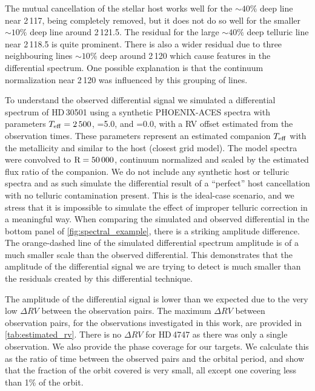 The mutual cancellation of the stellar host works well for the \(\sim40\%\) deep line near 2\,117\nm{}, being completely removed, but it does not do so well for the smaller \(\sim10\%\) deep line around 2\,121.5\nm{}.
The residual for the large \(\sim40\%\) deep telluric line near 2\,118.5\nm{} is quite prominent.
There is also a wider residual due to three neighbouring lines \(\sim10\%\) deep around 2\,120\nm{} which cause features in the differential spectrum.
One possible explanation is that the continuum normalization near 2\,120\nm{} was influenced by this grouping of lines.

To understand the observed differential signal we simulated a differential spectrum of {HD\,30501} using a synthetic {PHOENIX-ACES} spectra with parameters \(T_{\mathrm{eff}}{}=2\,500\)\K{}, \logg{}=5.0, and \feh{}=0.0, with a {RV} offset estimated from the observation times.
These parameters represent an estimated companion \(T_{\mathrm{eff}}{}\) with the metallicity and \logg{} similar to the host (closest grid model).
The model spectra were convolved to \(\textrm{R}=50\,000\), continuum normalized and scaled by the estimated flux ratio of the companion.
We do not include any synthetic host or telluric spectra and as such simulate the differential result of a ``perfect'' host cancellation with no telluric contamination present.
This is the ideal-case scenario, and we stress that it is impossible to simulate the effect of improper telluric correction in a meaningful way.
When comparing the simulated and observed differential in the bottom panel of \cref{fig:spectral_example}, there is a striking amplitude difference.
The orange-dashed line of the simulated differential spectrum amplitude is of a much smaller scale than the observed differential.
This demonstrates that the amplitude of the differential signal we are trying to detect is much smaller than the residuals created by this differential technique.

The amplitude of the differential signal is lower than we expected due to the very low \(\Delta {RV}\) between the observation pairs.
The maximum \(\Delta {RV}\) between observation pairs, for the observations investigated in this work, are provided in \cref{tab:estimated_rv}. {\red{} There is no \(\Delta {RV}\) for {HD\,4747} as there was only a single observation.
We also provide the phase coverage for our targets.
We calculate this as the ratio of time between the observed pairs and the orbital period, and show that the fraction of the orbit covered is very small, all except one covering less than 1\% of the orbit.}

